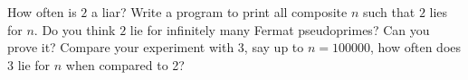   How often is $2$ a liar?
  Write a program to print all composite $n$ such that $2$ lies for $n$.
  Do you think $2$ lie for infinitely many Fermat pseudoprimes?
  Can you prove it?
  Compare your experiment with 3, say up to $n = 100000$,
  how often does 3 lie for $n$ when compared to 2?

